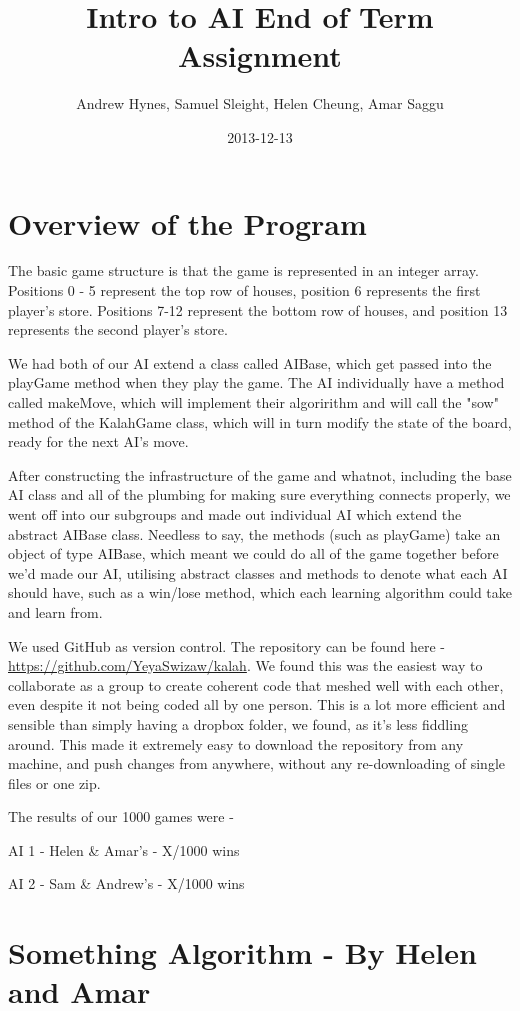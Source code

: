 \documentclass[11pt]{article}
\author{Andrew Hynes, Samuel Sleight, Helen Cheung, Amar Saggu}
\date{2013-12-13}
\title{Intro to AI End of Term Assignment}
\begin{document}
\maketitle
\tableofcontents


\section{Overview of the Program}
\label{sec-1}

The basic game structure is that the game is represented in an integer array. Positions 0 - 5 represent the top row of houses, position 6 represents the first player's store. Positions 7-12 represent the bottom row of houses, and position 13 represents the second player's store.

We had both of our AI extend a class called AIBase, which get passed into the playGame method when they play the game. The AI individually have a method called makeMove, which will implement their algoririthm and will call the "sow" method of the KalahGame class, which will in turn modify the state of the board, ready for the next AI's move.

After constructing the infrastructure of the game and whatnot, including the base AI class and all of the plumbing for making sure everything connects properly, we went off into our subgroups and made out individual AI which extend the abstract AIBase class. Needless to say, the methods (such as playGame) take an object of type AIBase, which meant we could do all of the game together before we'd made our AI, utilising abstract classes and methods to denote what each AI should have, such as a win/lose method, which each learning algorithm could take and learn from.

We used GitHub as version control. The repository can be found here - \url{https://github.com/YeyaSwizaw/kalah}. We found this was the easiest way to collaborate as a group to create coherent code that meshed well with each other, even despite it not being coded all by one person. This is a lot more efficient and sensible than simply having a dropbox folder, we found, as it's less fiddling around. This made it extremely easy to download the repository from any machine, and push changes from anywhere, without any re-downloading of single files or one zip.

The results of our 1000 games were -

AI 1 - Helen \& Amar's - X/1000 wins

AI 2 - Sam \& Andrew's - X/1000 wins
\section{Something Algorithm - By Helen and Amar}
\label{sec-2}
\end{document}
